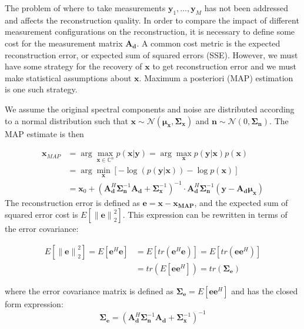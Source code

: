 \documentclass{article}
\providecommand{\norm}[1]{\left\lVert#1\right\rVert}
\begin{document}
The problem of where to take measurements $\bm{y}_1, \dots, \bm{y}_M$ has not
been addressed and affects the reconstruction quality.  In order to
compare the impact of different measurement configurations on the reconstruction, it is
necessary to define some cost for the measurement matrix $\bm{A}_{\bm{d}}$.  A common cost
metric is the expected reconstruction error, or expected sum of squared errors
(SSE). However, we must have some strategy for the recovery of $\bm{x}$ to get
reconstruction error and we must make statistical assumptions about $\bm{x}$.
Maximum a posteriori (MAP) estimation is one such strategy.

We assume the original spectral components and noise are distributed according to a
normal distribution such that $\bm{x} \sim \mathcal{N}(\bm{\mu}_{\bm{x}}, \bm{\Sigma}_{\bm{x}})$ and
$\bm{n} \sim \mathcal{N}(0, \bm{\Sigma}_{\bm{n}})$.  The MAP estimate is then

$$
\begin{aligned}
  \bm{x}_{MAP} &= \arg \max_{\bm{x} \in \mathbb{C}^n} p(\bm{x} | \bm{y})
  = \arg \max_{\bm{x}} p(\bm{y}|\bm{x}) p(\bm{x})\\
  &= \arg \min_{\bm{x}} \left[  - \log(p(\bm{y}|\bm{x})) - \log
  p(\bm{x})\right] \\
  &= \bm{x}_0 + \left( \bm{A}_{\bm{d}}^H\bm{\Sigma}_{\bm{n}}^{-1} \bm{A}_{\bm{d}} +
    \bm{\Sigma}_{\bm{x}}^{-1}\right)^{-1}
  \cdot  \bm{A}_{\bm{d}}^H \bm{\Sigma}_{\bm{n}}^{-1} (\bm{y} - \bm{A}_{\bm{d}} \bm{\mu}_{\bm{x}})
\end{aligned}
$$
The reconstruction error is defined as $\bm{e} = \bm{x} - \bm{x_{\text{MAP}}}$,
and the expected sum of squared error cost is $E[\norm{\bm{e}}_2^2]$. This
expression can be rewritten in terms of the error covariance:

\begin{align*}
E[\norm{\bm{e}}_2^2] =  E[\bm{e}^H\bm{e}] & = E[tr(\bm{e}^H\bm{e})] = E[tr(\bm{e}\bm{e}^H)] \\
& = tr(E[\bm{e}\bm{e}^H]) = tr(\bm{\Sigma}_{\bm{e}})
\end{align*}

where the error covariance matrix is defined as $\bm{\Sigma}_{\bm{e}} =
E[\bm{e}\bm{e}^H]$ and has the closed form expression:
\begin{equation}
\bm{\Sigma}_{\bm{e}} = \left( \bm{A}_{\bm{d}}^H\bm{\Sigma}_{\bm{n}}^{-1} \bm{A}_{\bm{d}} +
    \bm{\Sigma}_{\bm{x}}^{-1}\right)^{-1}
\end{equation}
\end{document}
